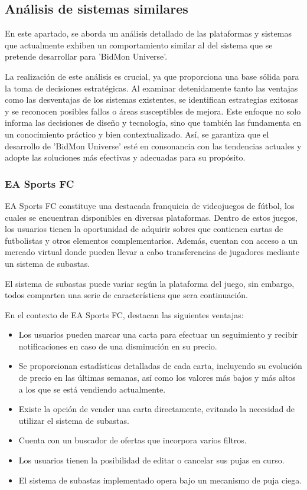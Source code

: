 \subsection{Análisis de sistemas similares}
En este apartado, se aborda un análisis detallado de las plataformas y sistemas que actualmente exhiben un comportamiento similar al del sistema que se pretende desarrollar para 'BidMon Universe'. 

La realización de este análisis es crucial, ya que proporciona una base sólida para la toma de decisiones estratégicas. Al examinar detenidamente tanto las ventajas como las desventajas de los sistemas existentes, se identifican estrategias exitosas y se reconocen posibles fallos o áreas susceptibles de mejora. Este enfoque no solo informa las decisiones de diseño y tecnología, sino que también las fundamenta en un conocimiento práctico y bien contextualizado. Así, se garantiza que el desarrollo de 'BidMon Universe' esté en consonancia con las tendencias actuales y adopte las soluciones más efectivas y adecuadas para su propósito.

\subsubsection{EA Sports FC}
EA Sports FC constituye una destacada franquicia de videojuegos de fútbol, los cuales se encuentran disponibles en diversas plataformas. Dentro de estos juegos, los usuarios tienen la oportunidad de adquirir sobres que contienen cartas de futbolistas y otros elementos complementarios. Además, cuentan con acceso a un mercado virtual donde pueden llevar a cabo transferencias de jugadores mediante un sistema de subastas.

El sistema de subastas puede variar según la plataforma del juego, sin embargo, todos comparten una serie de características que sera continuación.

En el contexto de EA Sports FC, destacan las siguientes ventajas:
\begin{itemize}
    \item Los usuarios pueden marcar una carta para efectuar un seguimiento y recibir notificaciones en caso de una disminución en su precio.
    \item Se proporcionan estadísticas detalladas de cada carta, incluyendo su evolución de precio en las últimas semanas, así como los valores más bajos y más altos a los que se está vendiendo actualmente.
    \item Existe la opción de vender una carta directamente, evitando la necesidad de utilizar el sistema de subastas. 
    \item Cuenta con un buscador de ofertas que incorpora varios filtros.
    \item Los usuarios tienen la posibilidad de editar o cancelar sus pujas en curso.
    \item El sistema de subastas implementado opera bajo un mecanismo de puja ciega.
\end{itemize}

